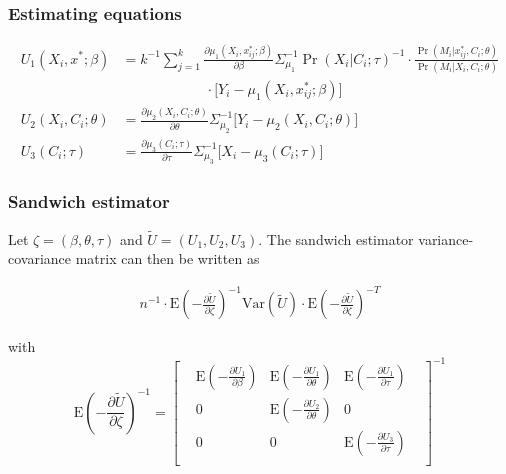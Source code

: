 \documentclass[]{article}
\begin{document}
\subsubsection*{Estimating equations}

\begin{align*}
\displaystyle U_{1}(X_i,x^*;\beta) &= k^{-1} \sum_{j=1}^{k} \frac{\partial \mu_1(X_i,x^*_{ij};\beta)}{\partial \beta} \Sigma_{\mu_1}^{-1} \Pr(X_i\vert C_i;\tau)^{-1} \cdot \frac{\Pr(M_i\vert x^*_{ij},C_i;\theta)}{\Pr(M_i\vert X_i,C_i;\theta)}\\[-0.6em] & \qquad \qquad \qquad \cdot \big[ Y_i - \mu_1(X_i,x^*_{ij};\beta) \big]\\[1em]
\displaystyle U_{2}(X_i,C_i;\theta) &= \frac{\partial \mu_2(X_i,C_i;\theta)}{\partial \theta} \Sigma_{\mu_2}^{-1} \big[ Y_i - \mu_2(X_i,C_i;\theta) \big]\\[1em]
\displaystyle U_{3}(C_i;\tau) &= \frac{\partial \mu_3(C_i;\tau)}{\partial \tau} \Sigma_{\mu_3}^{-1} \big[ X_i - \mu_3(C_i;\tau) \big]
\end{align*}

\subsubsection*{Sandwich estimator}

Let $\zeta = (\beta, \theta, \tau)$ and $\tilde U = (U_1, U_2, U_3)$. The sandwich estimator variance-covariance matrix can then be written as

\begin{eqnarray*}
\displaystyle n^{-1}\cdot\mbox{E}\left(-\frac{\partial \tilde U}{\partial \zeta}\right)^{-1} \mbox{Var}(\tilde U) \cdot \mbox{E}\left(-\frac{\partial \tilde U}{\partial \zeta}\right)^{-T}
\end{eqnarray*}

\noindent with 
\[
\renewcommand\arraystretch{2.5}
\displaystyle \mbox{E}\left(-\frac{\partial \tilde U}{\partial \zeta}\right)^{-1} = 
\begin{bmatrix}
& \displaystyle\mbox{E}\left(-\frac{\partial U_1}{\partial \beta}\right) & \displaystyle\mbox{E}\left(-\frac{\partial U_1}{\partial \theta}\right) & \displaystyle\mbox{E}\left(-\frac{\partial U_1}{\partial \tau}\right) &\\
& 0 & \displaystyle\mbox{E}\left(-\frac{\partial U_2}{\partial \theta}\right) & 0 &\\
& 0 & 0 & \displaystyle\mbox{E}\left(-\frac{\partial U_3}{\partial \tau}\right) &\\
\end{bmatrix}^{-1}
\]
\end{document}
